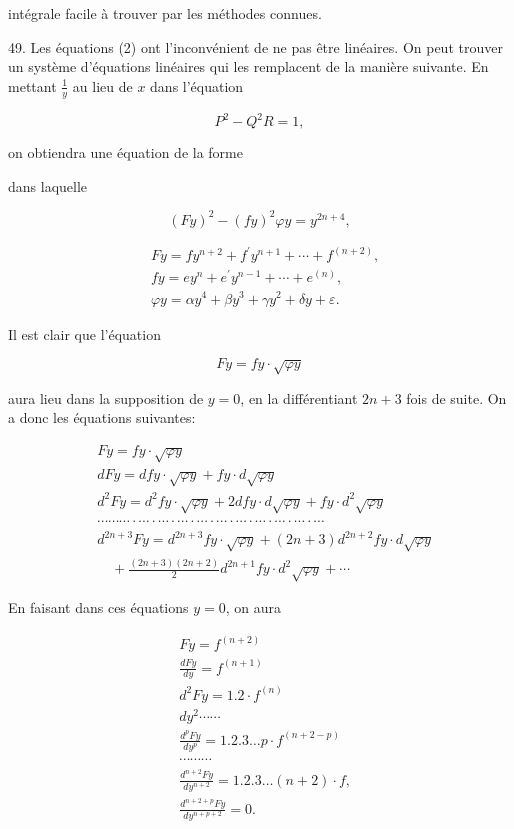 \documentclass{article}
\begin{document}
intégrale facile à trouver par les méthodes connues.

49. Les équations (2) ont l'inconvénient de ne pas être linéaires. On peut trouver un système d'équations linéaires qui les remplacent de la manière suivante. En mettant \(\frac{1}{y}\) au lieu de \(x\) dans l'équation

\[
P^{2}-Q^{2} R=1,
\]

on obtiendra une équation de la forme

dans laquelle

\[
(F y)^{2}-(f y)^{2} \varphi y=y^{2 n+4},
\]

\[
\begin{aligned}
& F y=f y^{n+2}+f^{\prime} y^{n+1}+\cdots+f^{(n+2)}, \\
& f y=e y^{n}+e^{\prime} y^{n-1}+\cdots+e^{(n)}, \\
& \varphi y=\alpha y^{4}+\beta y^{3}+\gamma y^{2}+\delta y+\varepsilon .
\end{aligned}
\]

Il est clair que l'équation

\[
F y=f y \cdot \sqrt{\varphi y}
\]

aura lieu dans la supposition de \(y=0\), en la différentiant \(2 n+3\) fois de suite. On a donc les équations suivantes:

\[
\begin{aligned}
& F y=f y \cdot \sqrt{\varphi y} \\
& d F y=d f y \cdot \sqrt{\varphi y}+f y \cdot d \sqrt{\varphi y} \\
& d^{2} F y=d^{2} f y \cdot \sqrt{\varphi y}+2 d f y \cdot d \sqrt{\varphi y}+f y \cdot d^{2} \sqrt{\varphi y} \\
& \cdots \cdots \cdots \cdot \cdots \cdot \cdots \cdot \cdots \cdot \cdots \cdot \cdots \cdot \cdots \cdot \cdots \cdot \cdots \cdot \cdots \cdot \cdots \\
& d^{2 n+3} F y=d^{2 n+3} f y \cdot \sqrt{\varphi y}+(2 n+3) d^{2 n+2} f y \cdot d \sqrt{\varphi y} \\
& \quad+\frac{(2 n+3)(2 n+2)}{2} d^{2 n+1} f y \cdot d^{2} \sqrt{\varphi y}+\cdots
\end{aligned}
\]

En faisant dans ces équations \(y=0\), on aura

\[
\begin{aligned}
& F y=f^{(n+2)} \\
& \frac{d F y}{d y}=f^{(n+1)} \\
& d^{2} F y=1.2 \cdot f^{(n)} \\
& d y^{2} \cdots \cdots \\
& \frac{d^{p} F y}{d y^{p}}=1.2 .3 \ldots p \cdot f^{(n+2-p)} \\
& \cdots \cdots \cdots \\
& \frac{d^{n+2} F y}{d y^{n+2}}=1.2 .3 \ldots(n+2) \cdot f, \\
& \frac{d^{n+2+p} F y}{d y^{n+p+2}}=0 .
\end{aligned}
\]
\end{document}
